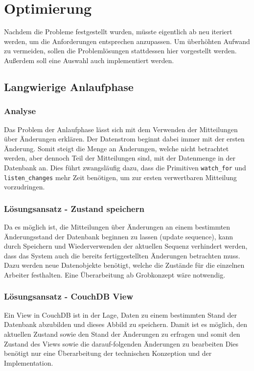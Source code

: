 \chapter{Optimierung}
\label{cha:opt}
Nachdem die Probleme festgestellt wurden,
müsste eigentlich ab  neu iteriert werden,
um die Anforderungen entsprechen anzupassen.
Um überhöhten Aufwand zu vermeiden,
sollen die Problemlösungen stattdessen hier vorgestellt werden.
Außerdem soll eine Auswahl auch implementiert werden.

\section{Langwierige Anlaufphase}
\label{cha:opt:anlaufphase}
\subsection{Analyse}

Das Problem der Anlaufphase lässt sich mit dem Verwenden der Mitteilungen über Änderungen erklären. Der Datenstrom beginnt dabei immer mit der ersten Änderung.
Somit steigt die Menge an Änderungen, welche nicht betrachtet werden, aber dennoch Teil der Mitteilungen sind, mit der Datenmenge in der Datenbank an.
Dies führt zwangsläufig dazu, dass die Primitiven \verb|watch_for| und \verb|listen_changes| mehr Zeit benötigen, um zur ersten verwertbaren Mitteilung vorzudringen.


\subsection{Lösungsansatz - Zustand speichern}

Da es möglich ist, die Mitteilungen über Änderungen an einem bestimmten Änderungsstand der Datenbank beginnen zu lassen (update sequence),
kann durch Speichern und Wiederverwenden der aktuellen Sequenz verhindert werden,
dass das System auch die bereits fertiggestellten Änderungen betrachten muss.
Dazu werden neue Datenobjekte benötigt, welche die Zustände für die einzelnen Arbeiter festhalten. Eine Überarbeitung ab Grobkonzept wäre notwendig.


\subsection{Lösungsansatz - CouchDB View}

Ein View in CouchDB ist in der Lage, Daten zu einem bestimmten Stand der Datenbank abzubilden und dieses Abbild zu speichern.
Damit ist es möglich, den aktuellen Zustand sowie den Stand der Änderungen zu erfragen und somit den Zustand des Views sowie die darauf-folgenden Änderungen zu bearbeiten 
Dies benötigt nur eine Überarbeitung der technischen Konzeption und der Implementation.

